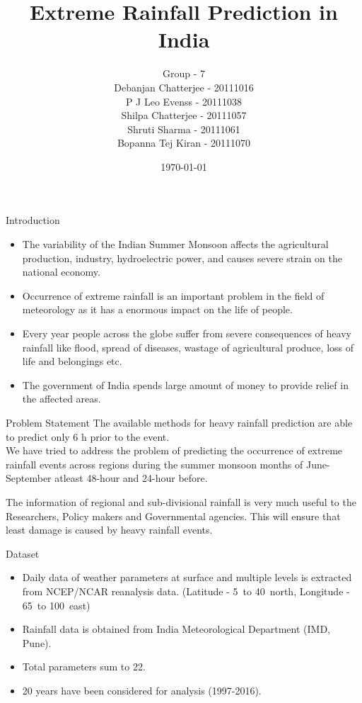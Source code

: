 \documentclass[11pt]{beamer}
\author[CS685]{ \large Group - 7  \\ \medskip  \small  Debanjan Chatterjee - 20111016  \\ P J Leo Evenss - 20111038 \\ Shilpa Chatterjee - 20111057 \\ Shruti Sharma - 20111061  \\Bopanna Tej Kiran - 20111070}
\title{Extreme Rainfall Prediction in India}
\institute[]{Indian Institute of Technology, Kanpur}
\date{\today}
\begin{document}
\begin{frame}
\titlepage
\end{frame}

\begin{frame}{Introduction}
\begin{itemize}
\item The variability of the Indian Summer Monsoon affects the agricultural production, industry, hydroelectric power, and causes severe strain on the national economy.\\

\item Occurrence of extreme rainfall is an important problem in the field of meteorology as it has a enormous impact on the life of people.\\

\item Every year people across the globe suffer from severe consequences of heavy rainfall like flood, spread of diseases, wastage of agricultural produce, loss of life and belongings etc.\\

\item The government of India spends large amount of money to provide relief in the affected areas.
\end{itemize}
\end{frame}

\begin{frame}{Problem Statement}
The available methods for heavy rainfall prediction are able to predict only 6 h prior to the event.\\
 We have tried to address the problem of predicting the occurrence of extreme rainfall events across regions during the summer monsoon months of June-September atleast 48-hour and 24-hour before.\\
 
 \medskip
 
The information of regional and sub-divisional rainfall is very much useful to the Researchers, Policy makers and Governmental agencies. This will ensure that least damage is caused by heavy rainfall events. 
\end{frame}

\begin{frame}{Dataset}
\begin{itemize}
\item Daily data of weather parameters at surface and multiple levels is extracted from NCEP/NCAR reanalysis data. (Latitude - 5\textdegree \ to 40\textdegree \ north,  Longitude - 65\textdegree \ to 100\textdegree \ east)
\item Rainfall data is obtained from India Meteorological Department (IMD, Pune).
\item Total parameters sum to 22.
\item 20 years have been considered for analysis (1997-2016).
\end{itemize}
\end{frame}
\end{document}
